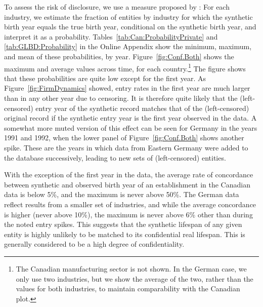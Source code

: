 
To assess the risk of disclosure, we use a measure proposed by \textcite{KinneyEtAl2011}: For each industry, we estimate the fraction of entities by industry for which the synthetic birth year equals the true birth year, conditional on the synthetic birth year, and interpret it as a probability. Tables~\ref{tab:Can:ProbabilityPrivate} and \ref{tab:GLBD:Probability} in the Online Appendix show the minimum, maximum, and mean of these probabilities, by year. Figure~\ref{fig:Conf.Both} shows the maximum and average values across time, for each country.\footnote{The Canadian manufacturing sector is not shown. In the German case, we only use two industries, but we show the average of the two, rather than the values for both industries, to maintain comparability with the Canadian plot.} The figure shows that these probabilities are quite low except for the first year. As Figure~\ref{fig:FirmDynamics} showed, entry rates in the first year are much larger than in any other year due to censoring. It is therefore quite likely that the (left-censored) entry year of the synthetic record matches that of the (left-censored) original record if the synthetic entry year is the first year observed in the data. A somewhat more muted version of this effect can be seen for Germany in the years 1991 and 1992, when the lower panel of %
Figure~\ref{fig:Conf.Both} shows another spike. These are the years in which data from Eastern Germany were added to the database successively, leading to new sets of (left-censored) entities. 

With the exception of the first year in the data, the average rate of concordance between synthetic and observed birth year of an establishment in the Canadian data is below 5\%, and the maximum is never above 50\%. The German data reflect results from a smaller set of industries, and while the average concordance is higher (never above 10\%), the maximum is never above 6\% other than during the noted entry spikes. This suggests that the synthetic lifespan of any given entity is highly unlikely to be matched to its confidential real lifespan. This is generally considered to be a high degree of confidentiality. 






